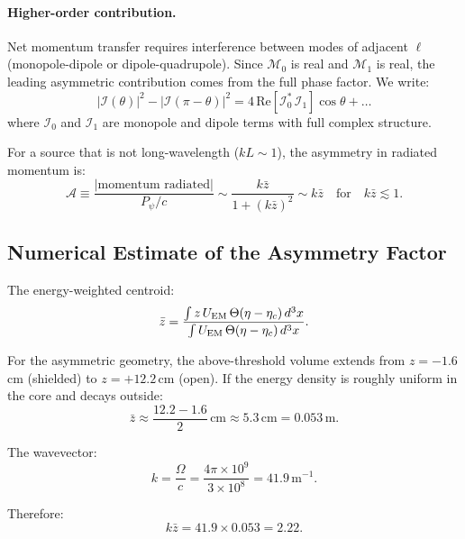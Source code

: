 \documentclass[11pt]{article}
\newcommand{\etac}{\eta_c}
\begin{document}
\paragraph{Higher-order contribution.}
Net momentum transfer requires interference between modes of adjacent
$\ell$ (monopole-dipole or dipole-quadrupole). Since $\mathcal{M}_0$
is real and $\mathcal{M}_1$ is real, the leading asymmetric contribution
comes from the full phase factor. We write:
\begin{equation}
|\mathcal{I}(\theta)|^2 - |\mathcal{I}(\pi - \theta)|^2
  = 4\,\text{Re}\!\left[\mathcal{I}_0^*\,\mathcal{I}_1\right]\cos\theta
  + \ldots
\end{equation}
where $\mathcal{I}_0$ and $\mathcal{I}_1$ are monopole and dipole terms
with full complex structure.

For a source that is not long-wavelength ($kL \sim 1$), the asymmetry
in radiated momentum is:
\begin{equation}
\mathcal{A} \equiv \frac{|\text{momentum radiated}|}{P_\psi/c}
  \sim \frac{k\bar{z}}{1 + (k\bar{z})^2} \sim k\bar{z}
  \quad\text{for}\quad k\bar{z} \lesssim 1.
\end{equation}

\subsection{Numerical Estimate of the Asymmetry Factor}

The energy-weighted centroid:
\begin{equation}
\bar{z} = \frac{\int z\,U_{\rm EM}\,\Theta(\eta - \etac)\,d^3x}
  {\int U_{\rm EM}\,\Theta(\eta - \etac)\,d^3x}.
\end{equation}

For the asymmetric geometry, the above-threshold volume extends from
$z = -1.6$\,cm (shielded) to $z = +12.2$\,cm (open). If the energy
density is roughly uniform in the core and decays outside:
\begin{equation}
\bar{z} \approx \frac{12.2 - 1.6}{2}\,\text{cm} \approx 5.3\,\text{cm}
  = 0.053\,\text{m}.
\end{equation}

The wavevector:
\begin{equation}
k = \frac{\Omega}{c} = \frac{4\pi \times 10^9}{3 \times 10^8}
  = 41.9\,\text{m}^{-1}.
\end{equation}

Therefore:
\begin{equation}
k\bar{z} = 41.9 \times 0.053 = 2.22.
\end{equation}
\end{document}
